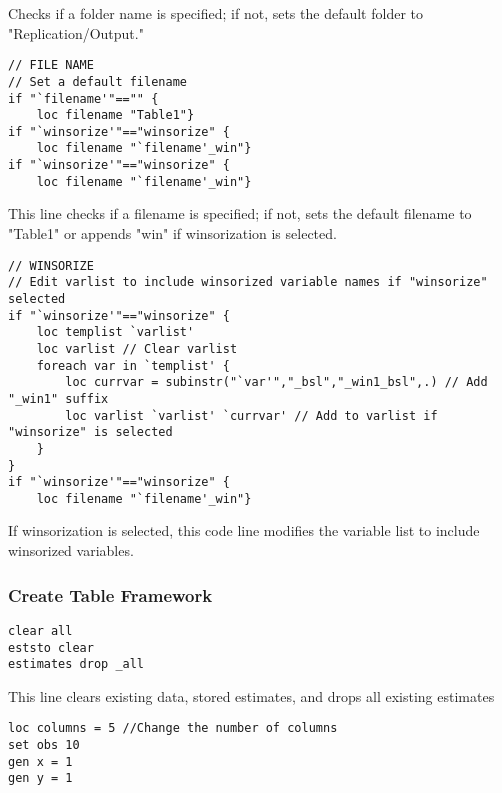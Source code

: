 \documentclass{article}
\begin{document}
Checks if a folder name is specified; if not, sets the default folder to "Replication/Output."

\begin{mdframed}
\begin{verbatim}
// FILE NAME 
// Set a default filename 
if "`filename'"=="" {
	loc filename "Table1"}
if "`winsorize'"=="winsorize" {
	loc filename "`filename'_win"}
if "`winsorize'"=="winsorize" {
	loc filename "`filename'_win"}
\end{verbatim}
\end{mdframed}

This line checks if a filename is specified; if not, sets the default filename to "Table1" or appends "win" if winsorization is selected.

\begin{mdframed}
\begin{verbatim}
// WINSORIZE 
// Edit varlist to include winsorized variable names if "winsorize" selected 
if "`winsorize'"=="winsorize" {
    loc templist `varlist'
	loc varlist // Clear varlist 
	foreach var in `templist' {
		loc currvar = subinstr("`var'","_bsl","_win1_bsl",.) // Add "_win1" suffix 
		loc varlist `varlist' `currvar' // Add to varlist if "winsorize" is selected
	}
}
if "`winsorize'"=="winsorize" {
	loc filename "`filename'_win"}
\end{verbatim}
\end{mdframed}

If winsorization is selected, this code line modifies the variable list to include winsorized variables.


\subsubsection{Create Table Framework}

\begin{mdframed}
\begin{verbatim}
clear all
eststo clear
estimates drop _all
\end{verbatim}
\end{mdframed}

This line clears existing data, stored estimates, and drops all existing estimates


\begin{mdframed}
\begin{verbatim}
loc columns = 5 //Change the number of columns
set obs 10
gen x = 1
gen y = 1
\end{verbatim}
\end{mdframed}
\end{document}
